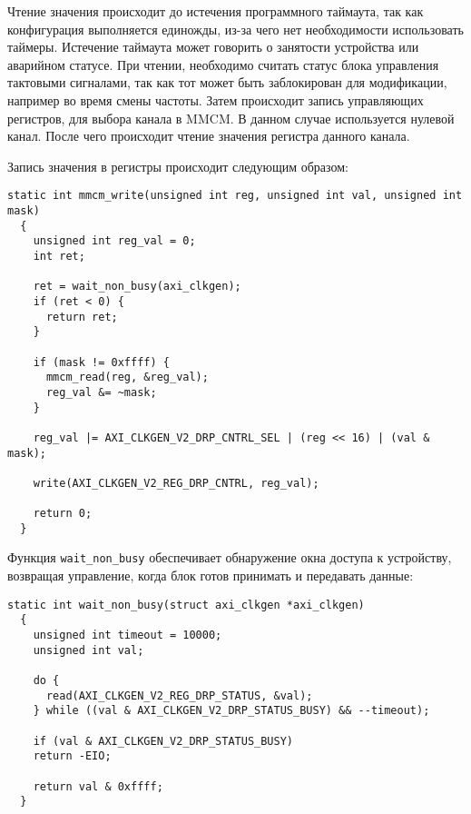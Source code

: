 Чтение значения происходит до истечения программного таймаута, так как
конфигурация выполняется единожды, из-за чего нет необходимости использовать
таймеры. Истечение таймаута может говорить о занятости устройства или аварийном статусе.
При чтении, необходимо считать статус блока управления тактовыми сигналами,
так как тот может быть заблокирован для модификации, например во время смены частоты.
Затем происходит запись управляющих регистров, для выбора канала в MMCM. В данном
случае используется нулевой канал. После чего происходит чтение значения регистра данного
канала.

Запись значения в регистры происходит следующим образом:
\medskip
\begin{lstlisting}[style=C]
  static int mmcm_write(unsigned int reg, unsigned int val, unsigned int mask)
  {
	unsigned int reg_val = 0;
	int ret;

	ret = wait_non_busy(axi_clkgen);
	if (ret < 0) {
      return ret;
    }

	if (mask != 0xffff) {
      mmcm_read(reg, &reg_val);
      reg_val &= ~mask;
	}

	reg_val |= AXI_CLKGEN_V2_DRP_CNTRL_SEL | (reg << 16) | (val & mask);

	write(AXI_CLKGEN_V2_REG_DRP_CNTRL, reg_val);

	return 0;
  }
\end{lstlisting}
\medskip

Функция \texttt{wait\_non\_busy} обеспечивает обнаружение окна доступа к устройству,
возвращая управление, когда блок готов принимать и передавать данные:
\medskip
\begin{lstlisting}[style=C]
  static int wait_non_busy(struct axi_clkgen *axi_clkgen)
  {
	unsigned int timeout = 10000;
	unsigned int val;

	do {
      read(AXI_CLKGEN_V2_REG_DRP_STATUS, &val);
	} while ((val & AXI_CLKGEN_V2_DRP_STATUS_BUSY) && --timeout);

	if (val & AXI_CLKGEN_V2_DRP_STATUS_BUSY)
    return -EIO;

	return val & 0xffff;
  }
\end{lstlisting}
\medskip

